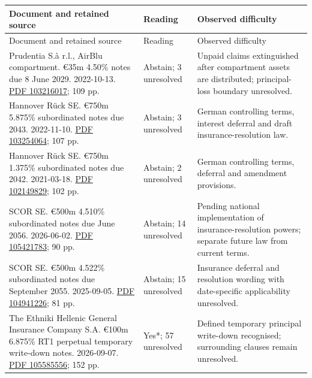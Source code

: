 {\small
\begin{longtable}{P{0.44\textwidth}P{0.12\textwidth}P{0.34\textwidth}}
\toprule
Document and retained source & Reading & Observed difficulty \\
\midrule
\endfirsthead
\toprule
Document and retained source & Reading & Observed difficulty \\
\midrule
\endhead
Prudentia S.à r.l., AirBlu compartment. €35m 4.50\% notes due 8 June 2029. 2022-10-13. \href{../prospectus/difficulty-2026-10-04/pdfs/case-103216017.pdf}{PDF 103216017}; 109 pp. & Abstain; 3 unresolved & Unpaid claims extinguished after compartment assets are distributed; principal-loss boundary unresolved. \\

Hannover Rück SE. €750m 5.875\% subordinated notes due 2043. 2022-11-10. \href{../prospectus/difficulty-2026-10-04/pdfs/case-103254064.pdf}{PDF 103254064}; 107 pp. & Abstain; 3 unresolved & German controlling terms, interest deferral and draft insurance-resolution law. \\

Hannover Rück SE. €750m 1.375\% subordinated notes due 2042. 2021-03-18. \href{../prospectus/difficulty-2026-10-04/pdfs/case-102149829.pdf}{PDF 102149829}; 102 pp. & Abstain; 2 unresolved & German controlling terms, deferral and amendment provisions. \\

SCOR SE. €500m 4.510\% subordinated notes due June 2056. 2026-06-02. \href{../prospectus/difficulty-2026-10-04/pdfs/case-105421783.pdf}{PDF 105421783}; 90 pp. & Abstain; 14 unresolved & Pending national implementation of insurance-resolution powers; separate future law from current terms. \\

SCOR SE. €500m 4.522\% subordinated notes due September 2055. 2025-09-05. \href{../prospectus/difficulty-2026-10-04/pdfs/case-104941226.pdf}{PDF 104941226}; 81 pp. & Abstain; 15 unresolved & Insurance deferral and resolution wording with date-specific applicability unresolved. \\

The Ethniki Hellenic General Insurance Company S.A. €100m 6.875\% RT1 perpetual temporary write-down notes. 2026-09-07. \href{../prospectus/difficulty-2026-10-04/pdfs/case-105585556.pdf}{PDF 105585556}; 152 pp. & Yes*; 57 unresolved & Defined temporary principal write-down recognised; surrounding clauses remain unresolved. \\


\end{longtable}}
